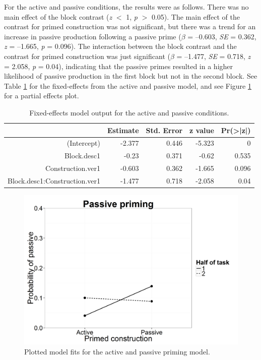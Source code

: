 For the active and passive conditions, the results were as follows. There was no main effect of the block contrast (\emph{z} $<$ 1, \emph{p} $>$ 0.05). The main effect of the contrast for primed construction was not significant, but there was a trend for an increase in passive production following a passive prime (\emph{$\beta$} = --0.603, \emph{SE} = 0.362, \emph{z} = --1.665, \emph{p} = 0.096). The interaction between the block contrast and the contrast for primed construction was just significant (\emph{$\beta$} = --1.477, \emph{SE} = 0.718, \emph{z} = 2.058, \emph{p} = 0.04), indicating that the passive primes resulted in a higher likelihood of passive production in the first block but not in the second block. See Table \ref{tab:priming.fixef.ap} for the fixed-effects from the active and passive model, and see Figure \ref{fig:priming.fixef.ap} for a partial effects plot. 

\begin{table}[htbp]
  \centering
  \caption{Fixed-effects model output for the active and passive conditions.}
    \begin{tabular}{rrrrr}
    \toprule
          & Estimate & Std. Error & z value & Pr(>|z|) \\
    \midrule
    (Intercept) & -2.377 & 0.446 & -5.323 & 0 \\
    Block.desc1 & -0.23 & 0.371 & -0.62 & 0.535 \\
    Construction.ver1 & -0.603 & 0.362 & -1.665 & 0.096 \\
    Block.desc1:Construction.ver1 & -1.477 & 0.718 & -2.058 & 0.04 \\
    \bottomrule
    \end{tabular}%
  \label{tab:priming.fixef.ap}%
\end{table}%


\begin{figure}[htbp]
\centering
\includegraphics[width=\textwidth,height=\textheight,keepaspectratio]{ap.png}
\caption{Plotted model fits for the active and passive priming model.}
\label{fig:priming.fixef.ap}
\end{figure}



